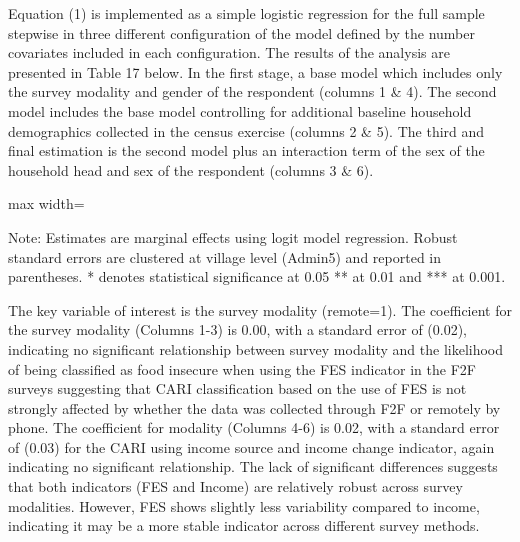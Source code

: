 \documentclass[11pt,harvard]{article}
\begin{document}
	Equation (1) is implemented as a simple logistic regression for the full sample stepwise in three different configuration of the model defined by the number covariates included in each configuration. The results of the analysis are presented in Table 17 below. In the first stage, a base model which includes only the survey modality and gender of the respondent (columns 1 \& 4). The second model includes the base model controlling for additional baseline household demographics collected in the census exercise (columns 2 \& 5). The third and final estimation is the second model plus an interaction term of the sex of the household head and sex of the respondent (columns 3 \& 6).
	
	\begin{table}[htbp]
		\centering
			\begin{adjustbox}{max width=\textwidth}
				\begin{threeparttable}
			\caption{Logit Regression on Food Security based Outcomes}
			\scriptsize
			 
			\label{tab:BF_FS_Logit}
			\begin{tablenotes}
				\item Note: Estimates are marginal effects using logit model regression. Robust standard errors are clustered at village level (Admin5) and reported in parentheses. * denotes statistical significance at 0.05 ** at 0.01 and *** at 0.001.
			\end{tablenotes}
				\end{threeparttable}
			\end{adjustbox}
	\end{table}
	
	The key variable of interest is the survey modality (remote=1). The coefficient for the survey modality (Columns 1-3) is 0.00, with a standard error of (0.02), indicating no significant relationship between survey modality and the likelihood of being classified as food insecure when using the FES indicator in the F2F surveys suggesting that CARI classification based on the use of FES is not strongly affected by whether the data was collected through F2F or remotely by phone. The coefficient for modality (Columns 4-6) is 0.02, with a standard error of (0.03) for the CARI using income source and income change indicator, again indicating no significant relationship. The lack of significant differences suggests that both indicators (FES and Income) are relatively robust across survey modalities. However, FES shows slightly less variability compared to income, indicating it may be a more stable indicator across different survey methods.
	
\end{document}
